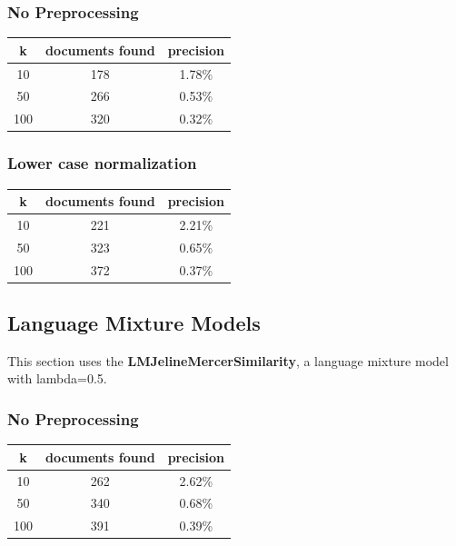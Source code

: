 \documentclass{article}
\begin{document}
\subsubsection{No Preprocessing}
\begin{center}
\begin{tabular}{|c|c|c|} \hline
\textbf{k} & \textbf{documents found} & \textbf{precision}\\ \hline
10 & 178 & 1.78\%\\
50 & 266 & 0.53\%\\
100 & 320 & 0.32\%\\ \hline

\end{tabular}
\end{center}

\subsubsection{Lower case normalization}
\begin{center}
\begin{tabular}{|c|c|c|} \hline
\textbf{k} & \textbf{documents found} & \textbf{precision}\\ \hline
10 & 221 & 2.21\%\\
50 & 323 & 0.65\%\\
100 & 372 & 0.37\%\\ \hline

\end{tabular}
\end{center}

\subsection{Language Mixture Models}
This section uses the \textbf{LMJelineMercerSimilarity}, a language mixture model with lambda=0.5.
\subsubsection{No Preprocessing}
\begin{center}
\begin{tabular}{|c|c|c|} \hline
\textbf{k} & \textbf{documents found} & \textbf{precision} \\ \hline
10 & 262 & 2.62\%\\
50 & 340 & 0.68\%\\
100 & 391 & 0.39\%\\ \hline

\end{tabular}
\end{center}
\end{document}
